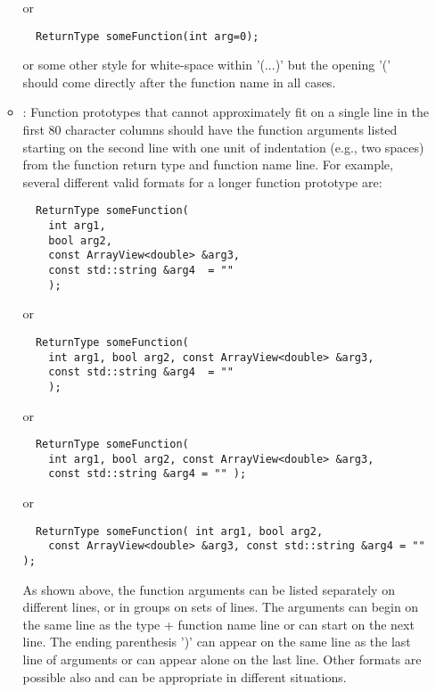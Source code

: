 \begin{itemize}
\begin{itemize}
  or 

  {\small\begin{verbatim}
  ReturnType someFunction(int arg=0);
  \end{verbatim}}

  or some other style for white-space within '(...)' but the opening '(' should
  come directly after the function name in all cases.

  \item\FSCLongFunctionPrototypesIndent: Function prototypes that cannot
  approximately fit on a single line in the first 80 character columns should
  have the function arguments listed starting on the second line with one unit
  of indentation (e.g., two spaces) from the function return type and function
  name line.  For example, several different valid formats for a longer
  function prototype are:

  {\small\begin{verbatim}
  ReturnType someFunction(
    int arg1,
    bool arg2,
    const ArrayView<double> &arg3,
    const std::string &arg4  = ""
    );
  \end{verbatim}}
  
  or
  
  {\small\begin{verbatim}
  ReturnType someFunction(
    int arg1, bool arg2, const ArrayView<double> &arg3,
    const std::string &arg4  = ""
    );
  \end{verbatim}}
  
  or
  
  {\small\begin{verbatim}
  ReturnType someFunction(
    int arg1, bool arg2, const ArrayView<double> &arg3,
    const std::string &arg4 = "" );
  \end{verbatim}}
  
  or
  
  {\small\begin{verbatim}
  ReturnType someFunction( int arg1, bool arg2,
    const ArrayView<double> &arg3, const std::string &arg4 = "" );
  \end{verbatim}}

  As shown above, the function arguments can be listed separately on different
  lines, or in groups on sets of lines.  The arguments can begin on the same
  line as the type + function name line or can start on the next line.  The
  ending parenthesis ')' can appear on the same line as the last line of
  arguments or can appear alone on the last line.  Other formats are possible
  also and can be appropriate in different situations.


\end{itemize}
\end{itemize}

